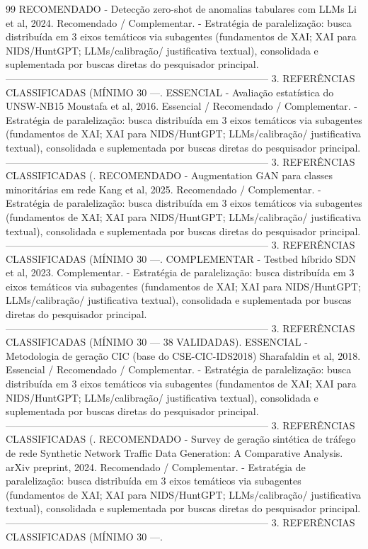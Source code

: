 \documentclass[12pt,a4paper]{article}
\begin{document}
\begin{thebibliography}{99}
 RECOMENDADO - Detecção zero-shot de anomalias tabulares com LLMs Li et al, 2024. Recomendado / Complementar. - Estratégia de paralelização: busca distribuída em 3 eixos temáticos via subagentes (fundamentos de XAI; XAI para NIDS/HuntGPT; LLMs/calibração/ justificativa textual), consolidada e suplementada por buscas diretas do pesquisador principal. -------------------------------------------------------------------------------- 3. REFERÊNCIAS CLASSIFICADAS (MÍNIMO 30 —.
 ESSENCIAL - Avaliação estatística do UNSW-NB15 Moustafa et al, 2016. Essencial / Recomendado / Complementar. - Estratégia de paralelização: busca distribuída em 3 eixos temáticos via subagentes (fundamentos de XAI; XAI para NIDS/HuntGPT; LLMs/calibração/ justificativa textual), consolidada e suplementada por buscas diretas do pesquisador principal. -------------------------------------------------------------------------------- 3. REFERÊNCIAS CLASSIFICADAS (.
 RECOMENDADO - Augmentation GAN para classes minoritárias em rede Kang et al, 2025. Recomendado / Complementar. - Estratégia de paralelização: busca distribuída em 3 eixos temáticos via subagentes (fundamentos de XAI; XAI para NIDS/HuntGPT; LLMs/calibração/ justificativa textual), consolidada e suplementada por buscas diretas do pesquisador principal. -------------------------------------------------------------------------------- 3. REFERÊNCIAS CLASSIFICADAS (MÍNIMO 30 —.
 COMPLEMENTAR - Testbed híbrido SDN et al, 2023. Complementar. - Estratégia de paralelização: busca distribuída em 3 eixos temáticos via subagentes (fundamentos de XAI; XAI para NIDS/HuntGPT; LLMs/calibração/ justificativa textual), consolidada e suplementada por buscas diretas do pesquisador principal. -------------------------------------------------------------------------------- 3. REFERÊNCIAS CLASSIFICADAS (MÍNIMO 30 — 38 VALIDADAS).
 ESSENCIAL - Metodologia de geração CIC (base do CSE-CIC-IDS2018) Sharafaldin et al, 2018. Essencial / Recomendado / Complementar. - Estratégia de paralelização: busca distribuída em 3 eixos temáticos via subagentes (fundamentos de XAI; XAI para NIDS/HuntGPT; LLMs/calibração/ justificativa textual), consolidada e suplementada por buscas diretas do pesquisador principal. -------------------------------------------------------------------------------- 3. REFERÊNCIAS CLASSIFICADAS (.
 RECOMENDADO - Survey de geração sintética de tráfego de rede Synthetic Network Traffic Data Generation: A Comparative Analysis. arXiv preprint, 2024. Recomendado / Complementar. - Estratégia de paralelização: busca distribuída em 3 eixos temáticos via subagentes (fundamentos de XAI; XAI para NIDS/HuntGPT; LLMs/calibração/ justificativa textual), consolidada e suplementada por buscas diretas do pesquisador principal. -------------------------------------------------------------------------------- 3. REFERÊNCIAS CLASSIFICADAS (MÍNIMO 30 —.

\end{thebibliography}
\end{document}
